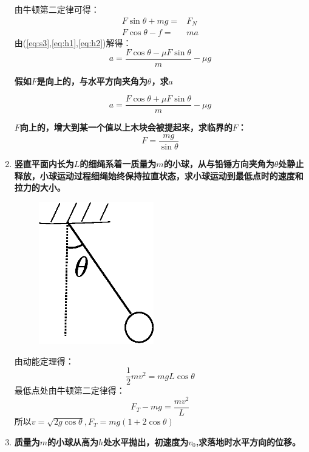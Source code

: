 \documentclass{article}
\begin{document}
\begin{enumerate}
由牛顿第二定律可得：
\begin{align}\label{eq:h1}
F\sin\theta + mg =&  F_N \\
F\cos\theta -f =& ma \label{eq:h2}
\end{align}
由(\ref{eq:s3},\ref{eq:h1},\ref{eq:h2})解得：
\begin{equation}
a= \frac{F\cos\theta-\mu F\sin \theta}{m} -\mu g
\end{equation}

\textbf{假如$F$是向上的，与水平方向夹角为$\theta$，求$a$}

\begin{equation}
a= \frac{F\cos\theta+\mu F\sin \theta}{m} -\mu g
\end{equation}

\textbf{$F$向上的，增大到某一个值以上木块会被提起来，求临界的$F$：}
\begin{equation}
F= \frac{mg}{\sin\theta}
\end{equation}
\item \textbf{竖直平面内长为$L$的细绳系着一质量为$m$的小球，从与铅锤方向夹角为$\theta$处静止释放，小球运动过程细绳始终保持拉直状态，求小球运动到最低点时的速度和拉力的大小。}
\begin{figure}[!ht]
\centering
\includegraphics[width=5cm]{fig2.eps}
\caption{}\label{fig:v}
\end{figure}

由动能定理得：
\[
\frac{1}{2}mv^2=mgL\cos\theta
\]
最低点处由牛顿第二定律得：
\[
F_T-mg=\frac{mv^2}{L}
\]
所以$v=\sqrt{2g\cos\theta},F_T=mg(1+2\cos\theta)$
\item \textbf{质量为$m$的小球从高为$h$处水平抛出，初速度为$v_0$,求落地时水平方向的位移。}


\end{enumerate}
\end{document}
